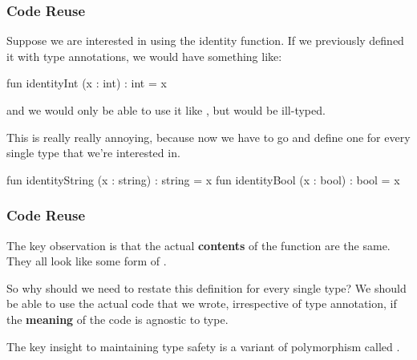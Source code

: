 \documentclass[aspectratio=169, handout]{beamer}
\begin{document}
\begin{frame}[fragile]
  \frametitle{Code Reuse}

  Suppose we are interested in using the identity function. If we previously
  defined it with type annotations, we would have something like:

  \pause
  \vspace{\fill}

  \begin{codeblock}
    fun identityInt (x : int) : int = x
  \end{codeblock}

  and we would only be able to use it like , but
   would be ill-typed.

  \pause
  \vspace{\fill}

  This is really really annoying, because now we have to go and define one for
  every single type that we're interested in.

  \pause
  \begin{codeblock}
    fun identityString (x : string) : string = x
    fun identityBool   (x : bool)   : bool   = x
  \end{codeblock}
\end{frame}

\begin{frame}[fragile]
  \frametitle{Code Reuse}

  The key observation is that the actual \textbf{contents} of the function
  are the same. They all look like some form of .

  \pause
  \vspace{\fill}

  So why should we need to restate this definition for every single type? We
  should be able to use the actual code that we wrote, irrespective of
  type annotation, if the \textbf{meaning} of the code is agnostic to type.

  \pause
  \vspace{\fill}

  The key insight to maintaining type safety is a variant of polymorphism called
  .
\end{frame}
\end{document}

